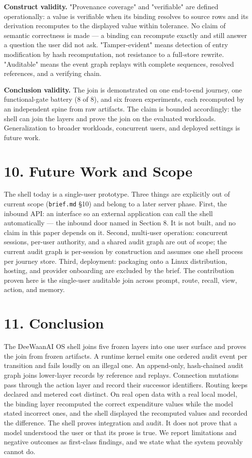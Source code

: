 \documentclass[11pt,a4paper]{article}
\begin{document}
\textbf{Construct validity.} "Provenance coverage" and "verifiable" are defined operationally: a value is verifiable when its binding resolves to source rows and its derivation recomputes to the displayed value within tolerance. No claim of semantic correctness is made --- a binding can recompute exactly and still answer a question the user did not ask. "Tamper-evident" means detection of entry modification by hash recomputation, not resistance to a full-store rewrite. "Auditable" means the event graph replays with complete sequences, resolved references, and a verifying chain.

\textbf{Conclusion validity.} The join is demonstrated on one end-to-end journey, one functional-gate battery (8 of 8), and six frozen experiments, each recomputed by an independent spine from raw artifacts. The claim is bounded accordingly: the shell can join the layers and prove the join on the evaluated workloads. Generalization to broader workloads, concurrent users, and deployed settings is future work.

\section*{10. Future Work and Scope}
The shell today is a single-user prototype. Three things are explicitly out of current scope (\texttt{brief.md} \S{}10) and belong to a later server phase. First, the inbound API: an interface so an external application can call the shell automatically --- the inbound door named in Section 8. It is not built, and no claim in this paper depends on it. Second, multi-user operation: concurrent sessions, per-user authority, and a shared audit graph are out of scope; the current audit graph is per-session by construction and assumes one shell process per journey store. Third, deployment: packaging onto a Linux distribution, hosting, and provider onboarding are excluded by the brief. The contribution proven here is the single-user auditable join across prompt, route, recall, view, action, and memory.

\section*{11. Conclusion}
The DeeWaanAI OS shell joins five frozen layers into one user surface and proves the join from frozen artifacts. A runtime kernel emits one ordered audit event per transition and fails loudly on an illegal one. An append-only, hash-chained audit graph joins lower-layer records by reference and replays. Connection mutations pass through the action layer and record their successor identifiers. Routing keeps declared and metered cost distinct. On real open data with a real local model, the binding layer recomputed the correct expenditure values while the model stated incorrect ones, and the shell displayed the recomputed values and recorded the difference. The shell proves integration and audit. It does not prove that a model understood the user or that its prose is true. We report limitations and negative outcomes as first-class findings, and we state what the system provably cannot do.
\end{document}

